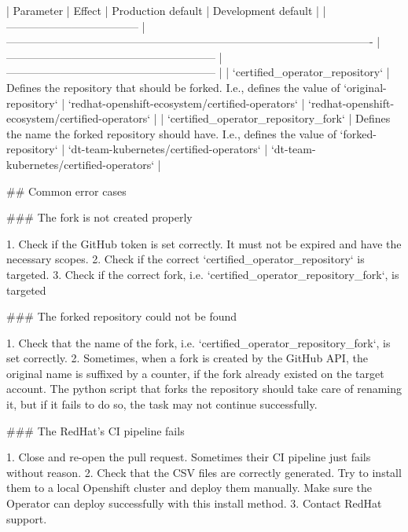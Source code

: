 | Parameter                            | Effect                                                                                               | Production default                                        | Development default                                       |
| ------------------------------------ | ---------------------------------------------------------------------------------------------------- | --------------------------------------------------------- | --------------------------------------------------------- |
| `certified_operator_repository`      | Defines the repository that should be forked. I.e., defines the value of `{original-repository}`     | `redhat-openshift-ecosystem/certified-operators` | `redhat-openshift-ecosystem/certified-operators` |
| `certified_operator_repository_fork` | Defines the name the forked repository should have. I.e., defines the value of `{forked-repository}` | `dt-team-kubernetes/certified-operators`         | `dt-team-kubernetes/certified-operators`         |

## Common error cases

### The fork is not created properly

1. Check if the GitHub token is set correctly. It must not be expired and have the necessary scopes.
2. Check if the correct `certified_operator_repository` is targeted.
3. Check if the correct fork, i.e. `certified_operator_repository_fork`, is targeted

### The forked repository could not be found

1. Check that the name of the fork, i.e. `certified_operator_repository_fork`, is set correctly.
2. Sometimes, when a fork is created by the GitHub API, the original name is suffixed by a counter, if the fork already existed on the target account.
   The python script that forks the repository should take care of renaming it, but if it fails to do so, the task may not continue successfully.

### The RedHat's CI pipeline fails

1. Close and re-open the pull request. 
   Sometimes their CI pipeline just fails without reason.
2. Check that the CSV files are correctly generated.
   Try to install them to a local Openshift cluster and deploy them manually.
   Make sure the Operator can deploy successfully with this install method.
3. Contact RedHat support.
